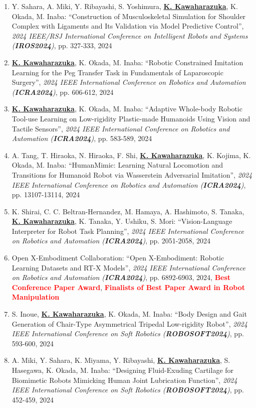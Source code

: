 \documentclass[letterpaper,11pt]{article}
\begin{document}
\begin{enumerate}
\item Y. Sahara, A. Miki, Y. Ribayashi, S. Yoshimura, \underline{\textbf{K. Kawaharazuka}}, K. Okada, M. Inaba: ``Construction of Musculoskeletal Simulation for Shoulder Complex with Ligaments and Its Validation via Model Predictive Control'', \textit{2024 IEEE/RSJ International Conference on Intelligent Robots and Systems (\textit{\textbf{IROS2024}})}, pp. 327-333, 2024
\item \underline{\textbf{K. Kawaharazuka}}, K. Okada, M. Inaba: ``Robotic Constrained Imitation Learning for the Peg Transfer Task in Fundamentals of Laparoscopic Surgery'', \textit{2024 IEEE International Conference on Robotics and Automation (\textit{\textbf{ICRA2024}})}, pp. 606-612, 2024
\item \underline{\textbf{K. Kawaharazuka}}, K. Okada, M. Inaba: ``Adaptive Whole-body Robotic Tool-use Learning on Low-rigidity Plastic-made Humanoids Using Vision and Tactile Sensors'', \textit{2024 IEEE International Conference on Robotics and Automation (\textit{\textbf{ICRA2024}})}, pp. 583-589, 2024
\item A. Tang, T. Hiraoka, N. Hiraoka, F. Shi, \underline{\textbf{K. Kawaharazuka}}, K. Kojima, K. Okada, M. Inaba: ``HumanMimic: Learning Natural Locomotion and Transitions for Humanoid Robot via Wasserstein Adversarial Imitation'', \textit{2024 IEEE International Conference on Robotics and Automation (\textit{\textbf{ICRA2024}})}, pp. 13107-13114, 2024
\item K. Shirai, C. C. Beltran-Hernandez, M. Hamaya, A. Hashimoto, S. Tanaka, \underline{\textbf{K. Kawaharazuka}}, K. Tanaka, Y. Ushiku, S. Mori: ``Vision-Language Interpreter for Robot Task Planning'', \textit{2024 IEEE International Conference on Robotics and Automation (\textit{\textbf{ICRA2024}})}, pp. 2051-2058, 2024
\item Open X-Embodiment Collaboration: ``Open X-Embodiment: Robotic Learning Datasets and RT-X Models'', \textit{2024 IEEE International Conference on Robotics and Automation (\textit{\textbf{ICRA2024}})}, pp. 6892-6903, 2024, \textbf{\textcolor{red}{Best Conference Paper Award}}, \textbf{\textcolor{red}{Finalists of Best Paper Award in Robot Manipulation}}
\item S. Inoue, \underline{\textbf{K. Kawaharazuka}}, K. Okada, M. Inaba: ``Body Design and Gait Generation of Chair-Type Asymmetrical Tripedal Low-rigidity Robot'', \textit{2024 IEEE International Conference on Soft Robotics (\textit{\textbf{ROBOSOFT2024}})}, pp. 593-600, 2024
\item A. Miki, Y. Sahara, K. Miyama, Y. Ribayashi, \underline{\textbf{K. Kawaharazuka}}, S. Hasegawa, K. Okada, M. Inaba: ``Designing Fluid-Exuding Cartilage for Biomimetic Robots Mimicking Human Joint Lubrication Function'', \textit{2024 IEEE International Conference on Soft Robotics (\textit{\textbf{ROBOSOFT2024}})}, pp. 452-459, 2024

\end{enumerate}
\end{document}
